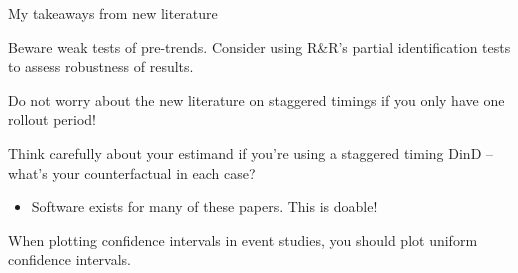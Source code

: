 \documentclass[notes,11pt, aspectratio=169]{beamer}
\newenvironment{wideitemize}{\itemize\addtolength{\itemsep}{10pt}}{\enditemize}
\begin{document}
\begin{frame}{My takeaways from new literature}
  \begin{wideitemize}
  \item Beware weak tests of pre-trends. Consider using R\&R's
    partial identification tests to assess robustness of results. 
  \item Do not worry about the new literature on staggered timings if you only have one rollout period!
  \item Think carefully about your estimand if you're using a staggered timing DinD -- what's your counterfactual in each case?
    \begin{itemize}
    \item Software exists for many of these papers. This is doable!
    \end{itemize}
  \item When plotting confidence intervals in event studies, you should plot uniform confidence intervals.
  \end{wideitemize}
\end{frame}
\end{document}

